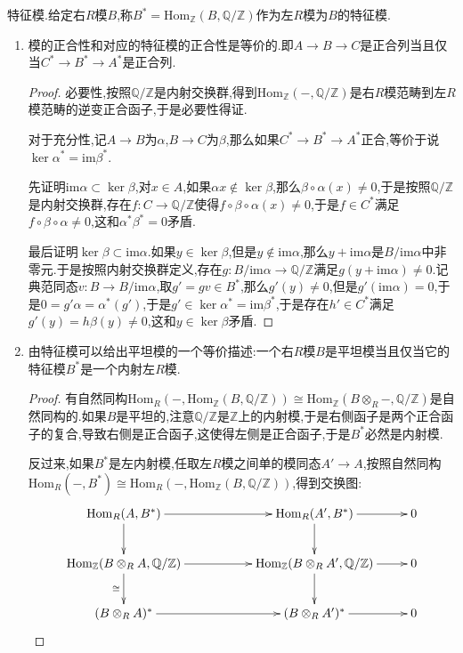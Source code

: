 特征模.给定右$R$模$B$,称$B^*=\mathrm{Hom}_{\mathbb{Z}}(B,\mathbb{Q}/\mathbb{Z})$作为左$R$模为$B$的特征模.
\begin{enumerate}
	\item 模的正合性和对应的特征模的正合性是等价的.即$A\to B\to C$是正合列当且仅当$C^*\to B^*\to A^*$是正合列.
	\begin{proof}
		
		必要性,按照$\mathbb{Q}/\mathbb{Z}$是内射交换群,得到$\mathrm{Hom}_{\mathbb{Z}}(-,\mathbb{Q}/\mathbb{Z})$是右$R$模范畴到左$R$模范畴的逆变正合函子,于是必要性得证.
		
		对于充分性,记$A\to B$为$\alpha$,$B\to C$为$\beta$,那么如果$C^*\to B^*\to A^*$正合,等价于说$\ker\alpha^*=\mathrm{im}\beta^*$.
		
		先证明$\mathrm{im}\alpha\subset\ker\beta$,对$x\in A$,如果$\alpha x\not\in\ker\beta$,那么$\beta\circ\alpha(x)\not=0$,于是按照$\mathbb{Q}/\mathbb{Z}$是内射交换群,存在$f:C\to\mathbb{Q}/\mathbb{Z}$使得$f\circ\beta\circ\alpha(x)\not=0$,于是$f\in C^*$满足$f\circ\beta\circ\alpha\not=0$,这和$\alpha^*\beta^*=0$矛盾.
		
		最后证明$\ker\beta\subset\mathrm{im}\alpha$.如果$y\in\ker\beta$,但是$y\not\in\mathrm{im}\alpha$,那么$y+\mathrm{im}\alpha$是$B/\mathrm{im}\alpha$中非零元.于是按照内射交换群定义,存在$g:B/\mathrm{im}\alpha\to\mathbb{Q}/\mathbb{Z}$满足$g(y+\mathrm{im}\alpha)\not=0$.记典范同态$v:B\to B/\mathrm{im}\alpha$,取$g'=gv\in B^*$,那么$g'(y)\not=0$,但是$g'(\mathrm{im}\alpha)=0$,于是$0=g'\alpha=\alpha^*(g')$,于是$g'\in\ker\alpha^*=\mathrm{im}\beta^*$,于是存在$h'\in C^*$满足$g'(y)=h\beta(y)\not=0$,这和$y\in\ker\beta$矛盾.
	\end{proof}
    \item 由特征模可以给出平坦模的一个等价描述:一个右$R$模$B$是平坦模当且仅当它的特征模$B^*$是一个内射左$R$模.
    \begin{proof}
    	
    	有自然同构$\mathrm{Hom} _R(-,\mathrm{Hom}_{\mathbb{Z}}(B,\mathbb{Q}/\mathbb{Z}))\cong\mathrm{Hom}_{\mathbb{Z}}(B\otimes_R-,\mathbb{Q}/\mathbb{Z})$是自然同构的.如果$B$是平坦的,注意$\mathbb{Q}/\mathbb{Z}$是$\mathbb{Z}$上的内射模,于是右侧函子是两个正合函子的复合,导致右侧是正合函子,这使得左侧是正合函子,于是$B^*$必然是内射模.
    	
    	反过来,如果$B^*$是左内射模,任取左$R$模之间单的模同态$A'\to A$,按照自然同构$\mathrm{Hom}_R(-,B^*)\cong\mathrm{Hom}_R(-,\mathrm{Hom}_{\mathbb{Z}}(B,\mathbb{Q}/\mathbb{Z}))$,得到交换图:
    	$$\xymatrix{\mathrm{Hom}_R(A,B^*)\ar[rr]\ar[d]&&\mathrm{Hom}_R(A',B^*)\ar[d]\ar[r]&0\\
    		\mathrm{Hom}_{\mathbb{Z}}(B\otimes_RA,\mathbb{Q}/\mathbb{Z})\ar[rr]\ar[d]_{\cong}&&\mathrm{Hom}_{\mathbb{Z}}(B\otimes_RA',\mathbb{Q}/\mathbb{Z})\ar[r]\ar[d]&0\\
    		(B\otimes_RA)^*\ar[rr]&&(B\otimes_RA')^*\ar[r]&0}$$
    	

\end{proof}
\end{enumerate}
